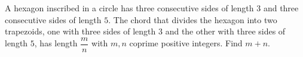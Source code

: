 A hexagon inscribed in a circle has three consecutive sides of length $3$ and three consecutive sides of length $5$. The chord that divides the hexagon into two trapezoids, one with three sides of length $3$ and the other with three sides of length $5$, has length $\dfrac mn$ with $m,n$ coprime positive integers. Find $m+n$.
